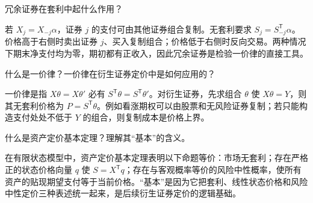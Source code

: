 \begin{problem}
 冗余证券在套利中起什么作用？
\end{problem}
\begin{solution}
若 $X_j=X_{-j}\alpha$，证券 $j$ 的支付可由其他证券组合复制。无套利要求 $S_j=S_{-j}^{\mathsf T}\alpha$。价格高于右侧时卖出证券 $j$、买入复制组合；价格低于右侧时反向交易。两种情况下期末净支付均为零，期初都有正收入，因此冗余证券是检验一价律的直接工具。
\end{solution}
\begin{problem}
 什么是一价律？一价律在衍生证券定价中是如何应用的？
\end{problem}
\begin{solution}
一价律是指 $X\theta=X\theta'$ 必有 $S^{\mathsf T}\theta=S^{\mathsf T}\theta'$。对衍生证券，先求组合 $\theta$ 使 $X\theta=Y$，则其无套利价格为 $P=S^{\mathsf T}\theta$。例如看涨期权可以由股票和无风险证券复制；若只能构造支付处处不低于 $Y$ 的组合，则复制成本是价格上界。
\end{solution}
\begin{problem}
 什么是资产定价基本定理？理解其“基本”的含义。
\end{problem}
\begin{solution}
在有限状态模型中，资产定价基本定理表明以下命题等价：市场无套利；存在严格正的状态价格向量 $q$ 使 $S=X^{\mathsf T}q$；存在与客观概率等价的风险中性概率，使所有资产的贴现期望支付等于当前价格。“基本”是因为它把套利、线性状态价格和风险中性定价三种表述统一起来，是后续衍生证券定价的逻辑基础。
\end{solution}

